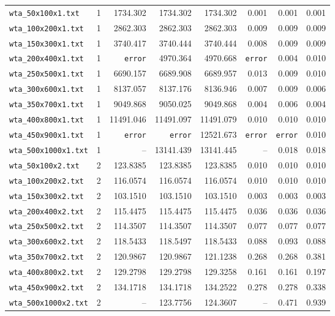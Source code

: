 \begin{longtable}{@{}lrrrrrrr@{}}
\bottomrule
\endlastfoot
\texttt{wta\_50x100x1.txt} & 1 & 1734.302 & 1734.302 & 1734.302 & 0.001 & 0.001 & 0.001 \\
\texttt{wta\_100x200x1.txt} & 1 & 2862.303 & 2862.303 & 2862.303 & 0.009 & 0.009 & 0.009 \\
\texttt{wta\_150x300x1.txt} & 1 & 3740.417 & 3740.444 & 3740.444 & 0.008 & 0.009 & 0.009 \\
\texttt{wta\_200x400x1.txt} & 1 & \texttt{error} & 4970.364 & 4970.668 & \texttt{error} & 0.004 & 0.010 \\
\texttt{wta\_250x500x1.txt} & 1 & 6690.157 & 6689.908 & 6689.957 & 0.013 & 0.009 & 0.010 \\
\texttt{wta\_300x600x1.txt} & 1 & 8137.057 & 8137.176 & 8136.946 & 0.007 & 0.009 & 0.006 \\
\texttt{wta\_350x700x1.txt} & 1 & 9049.868 & 9050.025 & 9049.868 & 0.004 & 0.006 & 0.004 \\
\texttt{wta\_400x800x1.txt} & 1 & 11491.046 & 11491.097 & 11491.079 & 0.010 & 0.010 & 0.010 \\
\texttt{wta\_450x900x1.txt} & 1 & \texttt{error} & \texttt{error} & 12521.673 & \texttt{error} & \texttt{error} & 0.010 \\
\texttt{wta\_500x1000x1.txt} & 1 & -- & 13141.439 & 13141.445 & -- & 0.018 & 0.018 \\
\texttt{wta\_50x100x2.txt} & 2 & 123.8385 & 123.8385 & 123.8385 & 0.010 & 0.010 & 0.010 \\
\texttt{wta\_100x200x2.txt} & 2 & 116.0574 & 116.0574 & 116.0574 & 0.010 & 0.010 & 0.010 \\
\texttt{wta\_150x300x2.txt} & 2 & 103.1510 & 103.1510 & 103.1510 & 0.003 & 0.003 & 0.003 \\
\texttt{wta\_200x400x2.txt} & 2 & 115.4475 & 115.4475 & 115.4475 & 0.036 & 0.036 & 0.036 \\
\texttt{wta\_250x500x2.txt} & 2 & 114.3507 & 114.3507 & 114.3507 & 0.077 & 0.077 & 0.077 \\
\texttt{wta\_300x600x2.txt} & 2 & 118.5433 & 118.5497 & 118.5433 & 0.088 & 0.093 & 0.088 \\
\texttt{wta\_350x700x2.txt} & 2 & 120.9867 & 120.9867 & 121.1238 & 0.268 & 0.268 & 0.381 \\
\texttt{wta\_400x800x2.txt} & 2 & 129.2798 & 129.2798 & 129.3258 & 0.161 & 0.161 & 0.197 \\
\texttt{wta\_450x900x2.txt} & 2 & 134.1718 & 134.1718 & 134.2522 & 0.278 & 0.278 & 0.338 \\
\texttt{wta\_500x1000x2.txt} & 2 & -- & 123.7756 & 124.3607 & -- & 0.471 & 0.939 \\

\end{longtable}
